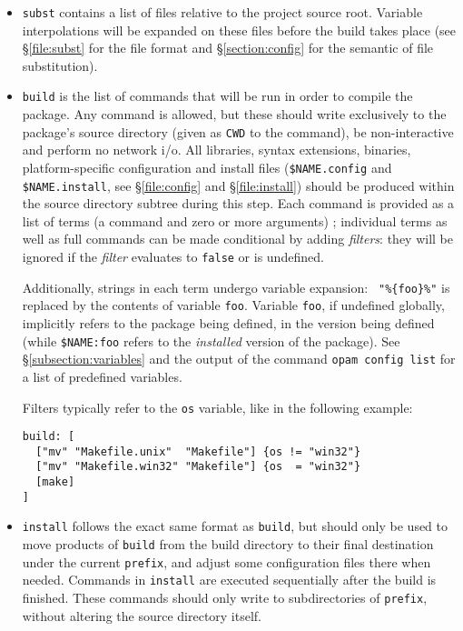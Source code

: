 \documentclass[a4paper,10pt]{article}
\begin{document}
\begin{itemize}
\item {\tt subst} contains a list of files relative to the project source root.
  Variable interpolations will be expanded on these files before the build takes
  place (see \S\ref{file:subst} for the file format and \S\ref{section:config}
  for the semantic of file substitution).

\item {\tt build} is the list of commands that will be run in order to compile
  the package. Any command is allowed, but these should write exclusively to the
  package's source directory (given as {\tt CWD} to the command), be
  non-interactive and perform no network i/o. All libraries, syntax extensions,
  binaries, platform-specific configuration and install files
  (\verb+$NAME.config+ and \verb+$NAME.install+, see \S\ref{file:config} and
  \S\ref{file:install}) should be produced within the source directory subtree
  during this step. Each command is provided as a list of terms (a command and
  zero or more arguments) ; individual terms as well as full commands can be
  made conditional by adding {\em filters}: they will be ignored if the {\em
    filter} evaluates to {\tt false} or is undefined.

  Additionally, strings in each term undergo variable expansion: {\tt
    "\%\{foo\}\%"} is replaced by the contents of variable {\tt foo}. Variable
  {\tt foo}, if undefined globally, implicitly refers to the package being
  defined, in the version being defined (while {\tt \$NAME:foo} refers to the
  {\em installed} version of the package). See \S\ref{subsection:variables} and
  the output of the command {\tt opam config list} for a list of predefined
  variables.

  Filters typically refer to the {\tt os} variable, like in the following
  example:

\begin{Verbatim}
build: [
  ["mv" "Makefile.unix"  "Makefile"] {os != "win32"}
  ["mv" "Makefile.win32" "Makefile"] {os  = "win32"}
  [make]
]
\end{Verbatim}

\item {\tt install} follows the exact same format as {\tt build}, but should
  only be used to move products of {\tt build} from the build directory to their
  final destination under the current {\tt prefix}, and adjust some
  configuration files there when needed. Commands in {\tt install} are executed
  sequentially after the build is finished. These commands should only write to
  subdirectories of {\tt prefix}, without altering the source directory itself.


\end{itemize}
\end{document}
